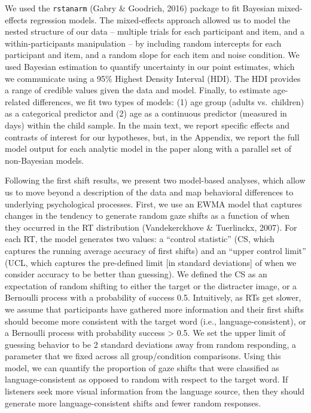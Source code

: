 \documentclass[,man,floatsintext]{apa6}
\begin{document}
We used the \texttt{rstanarm} (Gabry \& Goodrich, 2016) package to fit Bayesian mixed-effects regression models. The mixed-effects approach allowed us to model the nested structure of our data -- multiple trials for each participant and item, and a within-participants manipulation -- by including random intercepts for each participant and item, and a random slope for each item and noise condition. We used Bayesian estimation to quantify uncertainty in our point estimates, which we communicate using a 95\% Highest Density Interval (HDI). The HDI provides a range of credible values given the data and model. Finally, to estimate age-related differences, we fit two types of models: (1) age group (adults vs.~children) as a categorical predictor and (2) age as a continuous predictor (measured in days) within the child sample. In the main text, we report specific effects and contrasts of interest for our hypotheses, but, in the Appendix, we report the full model output for each analytic model in the paper along with a parallel set of non-Bayesian models.

Following the first shift results, we present two model-based analyses, which allow us to move beyond a description of the data and map behavioral differences to underlying psychological processes. First, we use an EWMA model that captures changes in the tendency to generate random gaze shifts as a function of when they occurred in the RT distribution (Vandekerckhove \& Tuerlinckx, 2007). For each RT, the model generates two values: a \enquote{control statistic} (CS, which captures the running average accuracy of first shifts) and an \enquote{upper control limit} (UCL, which captures the pre-defined limit {[}in standard deviations{]} of when we consider accuracy to be better than guessing). We defined the CS as an expectation of random shifting to either the target or the distracter image, or a Bernoulli process with a probability of success 0.5. Intuitively, as RTs get slower, we assume that participants have gathered more information and their first shifts should become more consistent with the target word (i.e., language-consistent), or a Bernoulli process with probability success \textgreater{} 0.5. We set the upper limit of guessing behavior to be 2 standard deviations away from random responding, a parameter that we fixed across all group/condition comparisons. Using this model, we can quantify the proportion of gaze shifts that were classified as language-consistent as opposed to random with respect to the target word. If listeners seek more visual information from the language source, then they should generate more language-consistent shifts and fewer random responses.
\end{document}
